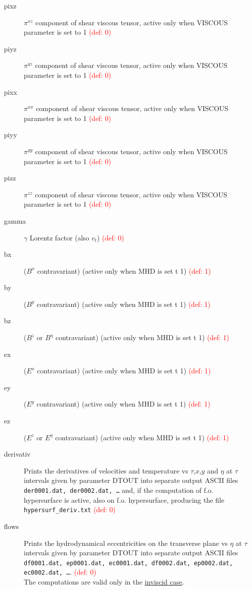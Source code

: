 \begin{description}
\item[pixz] $\pi^{xz}$ component of shear viscous tensor, active only when VISCOUS parameter is set to 1 \textcolor{red}{(def: 0)}
\item[piyz] $\pi^{yz}$ component of shear viscous tensor, active only when VISCOUS parameter is set to 1 \textcolor{red}{(def: 0)}
\item[pixx] $\pi^{xx}$ component of shear viscous tensor, active only when VISCOUS parameter is set to 1 \textcolor{red}{(def: 0)}
\item[piyy] $\pi^{yy}$ component of shear viscous tensor, active only when VISCOUS parameter is set to 1 \textcolor{red}{(def: 0)}
\item[pizz] $\pi^{zz}$ component of shear viscous tensor, active only when VISCOUS parameter is set to 1 \textcolor{red}{(def: 0)}
\item[gamma] $\gamma$ Lorentz factor (also $v_t$) \textcolor{red}{(def: 0)}
\item[bx] ($B^x$ contravariant) (active only when MHD is set t 1) \textcolor{red}{(def: 1)}
\item[by] ($B^y$ contravariant) (active only when MHD is set t 1) \textcolor{red}{(def: 1)}
\item[bz] ($B^z$ or $B^{\eta}$ contravariant) (active only when MHD is set t 1) \textcolor{red}{(def: 1)}
\item[ex] ($E^x$ contravariant) (active only when MHD is set t 1) \textcolor{red}{(def: 1)}
\item[ey] ($E^y$ contravariant) (active only when MHD is set t 1) \textcolor{red}{(def: 1)}
\item[ez] ($E^z$ or $E^{\eta}$ contravariant) (active only when MHD is set t 1) \textcolor{red}{(def: 1)}
\item[derivativ] Prints the derivatives of velocities and temperature vs $\tau$,$x$,$y$ and $\eta$ at $\tau$ intervals given by parameter DTOUT into separate output ASCII files {\tt der0001.dat, der0002.dat, \dots} and, if the computation of f.o. hypersurface is active, also on f.o. hypersurface, producing the file {\tt hypersurf\_deriv.txt}  \textcolor{red}{(def: 0)}
\item[flows]  Prints the hydrodynamical eccentricities on the transverse plane vs $\eta$ at $\tau$ intervals  given by parameter DTOUT into separate output ASCII files {\tt df0001.dat, ep0001.dat, ec0001.dat, df0002.dat, ep0002.dat, ec0002.dat, \dots}.  \textcolor{red}{(def: 0)}\\ 
The computations are valid only in the \underline{inviscid case}.\\

\end{description}
